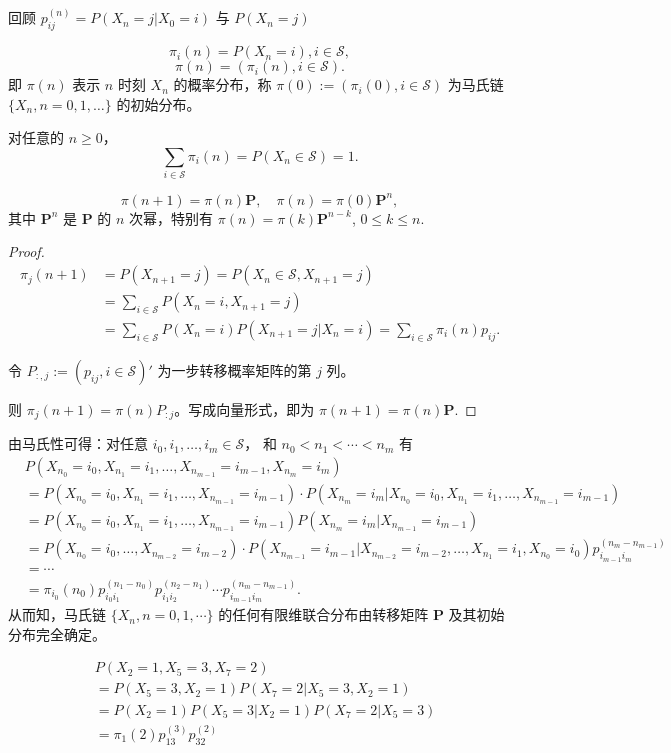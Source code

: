 \documentclass[lang=cn,10pt,thmcnt=section]{elegantbook}
\begin{document}
回顾 $p_{ij}^{(n)} = P(X_n = j | X_0 = i)$ 与 $P(X_n = j)$

\[
\pi_i(n) = P(X_n = i), i \in \mathcal{S},
\]
\[
\pi(n) = (\pi_i(n), i \in \mathcal{S}).
\]
即 $\pi(n)$ 表示 $n$ 时刻 $X_n$ 的概率分布，称 $\pi(0) := (\pi_i(0), i \in \mathcal{S})$ 为马氏链 $\{X_n, n = 0, 1, \ldots\}$ 的初始分布。

对任意的 $n \geq 0$，
\[
\sum_{i \in \mathcal{S}} \pi_i(n) = P(X_n \in \mathcal{S}) = 1.
\]
\begin{theorem}
	\[
\pi(n + 1) = \pi(n) \mathbf{P}, \quad \pi(n) = \pi(0) \mathbf{P}^n,
\]
其中 $\mathbf{P}^n$ 是 $\mathbf{P}$ 的 $n$ 次幂，特别有 $\pi(n) = \pi(k) \mathbf{P}^{n-k}$, $0 \leq k \leq n$.

\end{theorem}
\begin{proof}
	\[
\begin{aligned}
\pi_j(n + 1) &= P(X_{n+1} = j) = P(X_n \in \mathcal{S}, X_{n+1} = j) \\
&= \sum_{i \in \mathcal{S}} P(X_n = i, X_{n+1} = j) \\
&= \sum_{i \in \mathcal{S}} P(X_n = i) P(X_{n+1} = j | X_n = i) = \sum_{i \in \mathcal{S}} \pi_i(n) p_{ij}.
\end{aligned}
\]

令 $P_{:,j} := (p_{ij}, i \in \mathcal{S})'$ 为一步转移概率矩阵的第 $j$ 列。

则 $\pi_j(n + 1) = \pi(n) P_{:j}$。写成向量形式，即为 $\pi(n + 1) = \pi(n) \mathbf{P}$.
\end{proof}

由马氏性可得：对任意 $i_0, i_1, \ldots, i_m \in \mathcal{S}$，
和 $n_0 < n_1 < \cdots < n_m$ 有
\[
\begin{aligned}
& P(X_{n_0} = i_0, X_{n_1} = i_1, \ldots, X_{n_{m-1}} = i_{m-1}, X_{n_m} = i_m) \\
&= P(X_{n_0} = i_0, X_{n_1} = i_1, \ldots, X_{n_{m-1}} = i_{m-1}) \cdot P(X_{n_m} = i_m | X_{n_0} = i_0, X_{n_1} = i_1, \ldots, X_{n_{m-1}} = i_{m-1}) \\
&= P(X_{n_0} = i_0, X_{n_1} = i_1, \ldots, X_{n_{m-1}} = i_{m-1}) P(X_{n_m} = i_m | X_{n_{m-1}} = i_{m-1}) \\
&= P(X_{n_0} = i_0, \ldots, X_{n_{m-2}} = i_{m-2}) \cdot P(X_{n_{m-1}} = i_{m-1} | X_{n_{m-2}} = i_{m-2}, \ldots, X_{n_1} = i_1, X_{n_0} = i_0) p_{i_{m-1} i_m}^{(n_m - n_{m-1})} \\
&= \cdots \\
&= \pi_{i_0}(n_0) p_{i_0 i_1}^{(n_1 - n_0)} p_{i_1 i_2}^{(n_2 - n_1)} \cdots p_{i_{m-1} i_m}^{(n_m - n_{m-1})}.
\end{aligned}
\]
从而知，马氏链 $\{X_n, n = 0, 1, \cdots\}$ 的任何有限维联合分布由转移矩阵 $\mathbf{P}$ 及其初始分布完全确定。
\begin{example}
	\[
\begin{aligned}
& P(X_2 = 1, X_5 = 3, X_7 = 2) \\
&= P(X_5 = 3, X_2 = 1) P(X_7 = 2 | X_5 = 3, X_2 = 1) \\
&= P(X_2 = 1) P(X_5 = 3 | X_2 = 1) P(X_7 = 2 | X_5 = 3) \\
&= \pi_1(2) p_{13}^{(3)} p_{32}^{(2)}
\end{aligned}
\]
\end{example}
\end{document}
